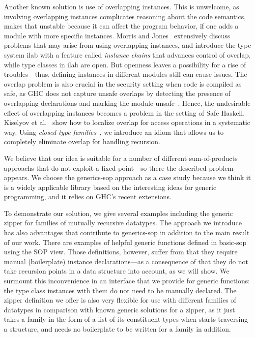 \documentclass[runningheads]{llncs}
\begin{document}
Another known solution is use of overlapping instances. This is unwelcome, as involving overlapping instances complicates reasoning about the code semantics, makes that unstable because it can affect the program behavior, if one adds a module with more specific instances. Morris and Jones~\cite{Morris2010} extensively discuss problems that may arise from using overlapping instances, and introduce the type system \textsf{ilab} with a feature called \emph{instance chains} that advances control of overlap, while type classes in \textsf{ilab} are open. But openness leaves a possibility for a rise of troubles---thus, defining instances in different modules still can cause issues. The overlap problem is also crucial in the security setting when code is compiled as safe, as GHC does not capture unsafe overlaps by detecting the presence of overlapping declarations and marking the module unsafe~\cite{sh-overlapping}. Hence, the undesirable effect of overlapping instances becomes a problem in the setting of Safe Haskell. Kiselyov et al.~\cite{Kiselyov2004} show how to localize overlap for access operations in a systematic way. Using \textit{closed type families}~\cite{Eisenberg2014}, we introduce an idiom that allows us to completely eliminate overlap for handling recursion.

We believe that our idea is suitable for a number of different sum-of-products approachs that do not exploit a fixed point---so there the described problem appears. We choose the \textsf{generics-sop} approach as a case study because we think it is a widely applicable library based on the interesting ideas for generic programming, and it relies on GHC's recent extensions.

To demonstrate our solution, we give several examples including the generic zipper for families of mutually recursive datatypes. The approach we introduce has also advantages that contribute to \textsf{generics-sop} in addition to the main result of our work. There are examples of helpful generic functions defined in \textsf{basic-sop}~\cite{basic-sop} using the SOP view. Those definitions, however, suffer from that they require manual (boilerplate) instance declarations---as a consequence of that they do not take recursion points in a data structure into account, as we will show. We surmount this inconvenience in an interface that we provide for generic functions: the type class instances with them do not need to be manually declared. The zipper definition we offer is also very flexible for use with different families of datatypes in comparison with known generic solutions for a zipper, as it just takes a family in the form of a list of its constituent types when starts traversing a structure, and needs no boilerplate to be written for a family in addition.
\end{document}
